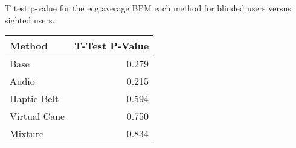 
\centering
\caption{T test p-value for the ecg average BPM each method for blinded users versus sighted users.}
\label{tab:ttest_ecg_bpm}
\begin{tabular}{lr}
\toprule
      Method &  T-Test P-Value \\
\midrule
        Base &           0.279 \\
       Audio &           0.215 \\
 Haptic Belt &           0.594 \\
Virtual Cane &           0.750 \\
     Mixture &           0.834 \\
\bottomrule
\end{tabular}
